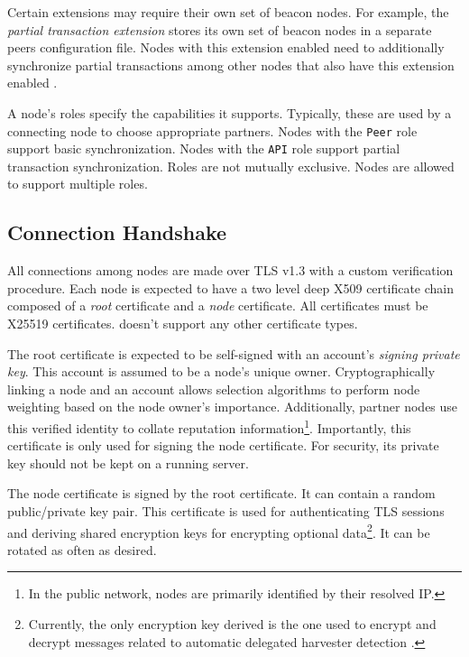 Certain extensions may require their own set of beacon nodes.
For example, the \emph{partial transaction extension} stores its own set of beacon nodes in a separate peers configuration file.
Nodes with this extension enabled need to additionally synchronize partial transactions among other nodes that also have this extension enabled  .

A node's roles specify the capabilities it supports.
Typically, these are used by a connecting node to choose appropriate partners.
Nodes with the \texttt{Peer} role support basic synchronization.
Nodes with the \texttt{API} role support partial transaction synchronization.
Roles are not mutually exclusive.
Nodes are allowed to support multiple roles.

\subsection{Connection Handshake}
\label{sec:network:connectionHandshake}

All connections among \codenamespace nodes are made over TLS v1.3 with a custom verification procedure.
Each node is expected to have a two level deep X509 certificate chain composed of a \emph{root} certificate and a \emph{node} certificate.
All certificates must be X25519 certificates.
\codenamespace doesn't support any other certificate types.

The root certificate is expected to be self-signed with an account's \emph{signing private key}.
This account is assumed to be a node's unique owner.
Cryptographically linking a node and an account allows selection algorithms to perform node weighting based on the node owner's importance.
Additionally, partner nodes use this verified identity to collate reputation  information\footnote{
	In the public network, nodes are primarily identified by their resolved IP.
}.
Importantly, this certificate is only used for signing the node certificate.
For security, its private key should not be kept on a running server.

The node certificate is signed by the root certificate.
It can contain a random public/private key pair.
This certificate is used for authenticating TLS sessions and deriving shared encryption keys for encrypting optional data\footnote{
	Currently, the only encryption key derived is the one used to encrypt and decrypt messages related to automatic delegated harvester detection
	.
}.
It can be rotated as often as desired.

